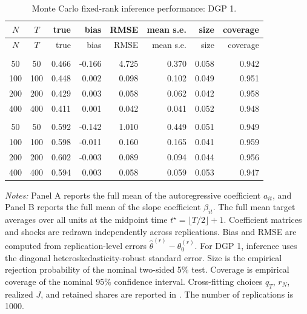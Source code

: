 \begingroup
\small
\setlength{\LTleft}{0pt plus 1fill}
\setlength{\LTright}{0pt plus 1fill}
\begin{longtable}{ccrrrrrr}
\caption{Monte Carlo fixed-rank inference performance: DGP 1.}\label{tab:mc_perf_dgp1}\label{tab:mc_main_summary}\\
\toprule
$N$ & $T$ & true & bias & RMSE & mean s.e. & size & coverage \\
\midrule
\endfirsthead
\toprule
$N$ & $T$ & true & bias & RMSE & mean s.e. & size & coverage \\
\midrule
\endhead
\bottomrule
\endfoot
\multicolumn{8}{l}{\textit{Panel A. Autoregressive coefficient full mean}}\\
50 & 50 & 0.466 & -0.166 & 4.725 & 0.370 & 0.058 & 0.942 \\
100 & 100 & 0.448 & 0.002 & 0.098 & 0.102 & 0.049 & 0.951 \\
200 & 200 & 0.429 & 0.003 & 0.058 & 0.062 & 0.042 & 0.958 \\
400 & 400 & 0.411 & 0.001 & 0.042 & 0.041 & 0.052 & 0.948 \\
\addlinespace
\multicolumn{8}{l}{\textit{Panel B. Slope coefficient full mean}}\\
50 & 50 & 0.592 & -0.142 & 1.010 & 0.449 & 0.051 & 0.949 \\
100 & 100 & 0.598 & -0.011 & 0.160 & 0.165 & 0.041 & 0.959 \\
200 & 200 & 0.602 & -0.003 & 0.089 & 0.094 & 0.044 & 0.956 \\
400 & 400 & 0.594 & 0.003 & 0.058 & 0.059 & 0.053 & 0.947 \\
\end{longtable}
\par\smallskip
{\footnotesize\begin{minipage}{0.92\textwidth}\textit{Notes:} Panel A reports the full mean of the autoregressive coefficient $a_{it}$, and Panel B reports the full mean of the slope coefficient $\beta_{it}$. The full mean target averages over all units at the midpoint time $t^\star=\lfloor T/2\rfloor+1$. Coefficient matrices and shocks are redrawn independently across replications. Bias and RMSE are computed from replication-level errors $\widehat\theta^{(r)}-\theta_0^{(r)}$. For DGP 1, inference uses the diagonal heteroskedasticity-robust standard error. Size is the empirical rejection probability of the nominal two-sided 5\% test. Coverage is empirical coverage of the nominal 95\% confidence interval. Cross-fitting choices $q_T$, $r_N$, realized $J$, and retained shares are reported in . The number of replications is 1000.\end{minipage}}
\endgroup
